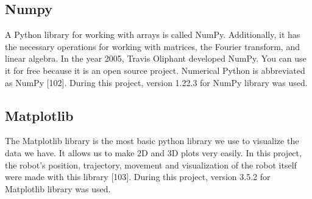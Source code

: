 \documentclass[12pt,twoside,a4]{mwbk}
\begin{document}
\subsection{Numpy}
A Python library for working with arrays is called NumPy. Additionally, it has the necessary operations for working with matrices, the Fourier transform, and linear algebra. In the year 2005, Travis Oliphant developed NumPy. You can use it for free because it is an open source project. Numerical Python is abbreviated as NumPy [102]. During this project, version 1.22.3 for NumPy library was used.

\subsection{Matplotlib}
The Matplotlib library is the most basic python library we use to visualize the data we have. It allows us to make 2D and 3D plots very easily. In this project, the robot's position, trajectory, movement and visualization of the robot itself were made with this library [103]. During this project, version 3.5.2 for Matplotlib library was used.
\end{document}
